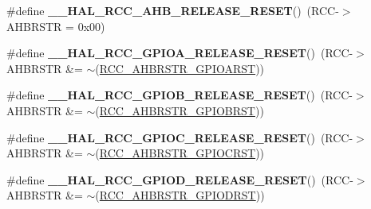 \begin{DoxyCompactItemize}
\item 
\hypertarget{group___r_c_c___peripheral___clock___force___release_gab9a849fdb7ef7ea4021af51799b474d7}{\#define {\bfseries \-\_\-\-\_\-\-H\-A\-L\-\_\-\-R\-C\-C\-\_\-\-A\-H\-B\-\_\-\-R\-E\-L\-E\-A\-S\-E\-\_\-\-R\-E\-S\-E\-T}()~(R\-C\-C-\/$>$A\-H\-B\-R\-S\-T\-R = 0x00)}\label{group___r_c_c___peripheral___clock___force___release_gab9a849fdb7ef7ea4021af51799b474d7}

\item 
\hypertarget{group___r_c_c___peripheral___clock___force___release_gad56e47c2eacd972491f94296053d0cc3}{\#define {\bfseries \-\_\-\-\_\-\-H\-A\-L\-\_\-\-R\-C\-C\-\_\-\-G\-P\-I\-O\-A\-\_\-\-R\-E\-L\-E\-A\-S\-E\-\_\-\-R\-E\-S\-E\-T}()~(R\-C\-C-\/$>$A\-H\-B\-R\-S\-T\-R \&= $\sim$(\hyperlink{group___peripheral___registers___bits___definition_ga327f966b6e8dc82dc0ac950539ce0407}{R\-C\-C\-\_\-\-A\-H\-B\-R\-S\-T\-R\-\_\-\-G\-P\-I\-O\-A\-R\-S\-T}))}\label{group___r_c_c___peripheral___clock___force___release_gad56e47c2eacd972491f94296053d0cc3}

\item 
\hypertarget{group___r_c_c___peripheral___clock___force___release_gaf03da3b36478071844fbd77df618a686}{\#define {\bfseries \-\_\-\-\_\-\-H\-A\-L\-\_\-\-R\-C\-C\-\_\-\-G\-P\-I\-O\-B\-\_\-\-R\-E\-L\-E\-A\-S\-E\-\_\-\-R\-E\-S\-E\-T}()~(R\-C\-C-\/$>$A\-H\-B\-R\-S\-T\-R \&= $\sim$(\hyperlink{group___peripheral___registers___bits___definition_gab07dc17b79c908bdbf9cf196947d0035}{R\-C\-C\-\_\-\-A\-H\-B\-R\-S\-T\-R\-\_\-\-G\-P\-I\-O\-B\-R\-S\-T}))}\label{group___r_c_c___peripheral___clock___force___release_gaf03da3b36478071844fbd77df618a686}

\item 
\hypertarget{group___r_c_c___peripheral___clock___force___release_ga1df0e3536d3450435bdccdbe9c878736}{\#define {\bfseries \-\_\-\-\_\-\-H\-A\-L\-\_\-\-R\-C\-C\-\_\-\-G\-P\-I\-O\-C\-\_\-\-R\-E\-L\-E\-A\-S\-E\-\_\-\-R\-E\-S\-E\-T}()~(R\-C\-C-\/$>$A\-H\-B\-R\-S\-T\-R \&= $\sim$(\hyperlink{group___peripheral___registers___bits___definition_ga5b837c7b81c1a4b8f986c23b7c5b5afa}{R\-C\-C\-\_\-\-A\-H\-B\-R\-S\-T\-R\-\_\-\-G\-P\-I\-O\-C\-R\-S\-T}))}\label{group___r_c_c___peripheral___clock___force___release_ga1df0e3536d3450435bdccdbe9c878736}

\item 
\hypertarget{group___r_c_c___peripheral___clock___force___release_ga29fbf71f71ea27ffa38e7283b6dce03d}{\#define {\bfseries \-\_\-\-\_\-\-H\-A\-L\-\_\-\-R\-C\-C\-\_\-\-G\-P\-I\-O\-D\-\_\-\-R\-E\-L\-E\-A\-S\-E\-\_\-\-R\-E\-S\-E\-T}()~(R\-C\-C-\/$>$A\-H\-B\-R\-S\-T\-R \&= $\sim$(\hyperlink{group___peripheral___registers___bits___definition_ga9054c3b77b70344f0edb27e3397fee77}{R\-C\-C\-\_\-\-A\-H\-B\-R\-S\-T\-R\-\_\-\-G\-P\-I\-O\-D\-R\-S\-T}))}\label{group___r_c_c___peripheral___clock___force___release_ga29fbf71f71ea27ffa38e7283b6dce03d}


\end{DoxyCompactItemize}

